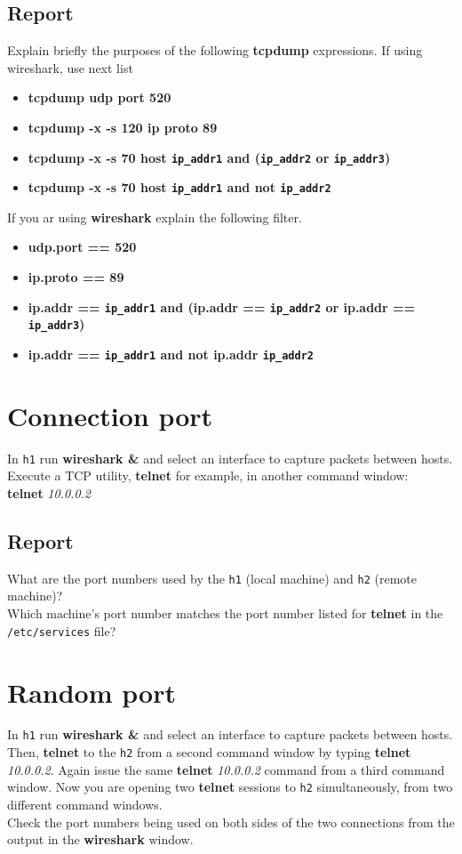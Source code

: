 \documentclass[10pt,a4paper]{article}
\numberwithin{equation}{section}
\numberwithin{figure}{section}
\numberwithin{table}{section}
\begin{document}
\subsection*{Report}
Explain briefly the purposes of the following \textbf{tcpdump} expressions. If using wireshark, use next list
\begin{itemize}
    \item \textbf{tcpdump udp port 520}
    \item \textbf{tcpdump -x -s 120 ip proto 89}
    \item \textbf{tcpdump -x -s 70 host \texttt{ip\_addr1} and (\texttt{ip\_addr2} or \texttt{ip\_addr3})}
    \item \textbf{tcpdump -x -s 70 host \texttt{ip\_addr1} and not \texttt{ip\_addr2}}
\end{itemize}
If you ar using \textbf{wireshark} explain the following filter.
\begin{itemize}
    \item \textbf{udp.port == 520}
    \item \textbf{ip.proto == 89}
    \item \textbf{ip.addr == \texttt{ip\_addr1} and (ip.addr == \texttt{ip\_addr2} or ip.addr == \texttt{ip\_addr3})}
    \item \textbf{ip.addr == \texttt{ip\_addr1} and not ip.addr \texttt{ip\_addr2}}
\end{itemize}

\section{Connection port}
    In \texttt{h1} run \textbf{wireshark \&} and select an interface to capture packets between hosts. \\
    Execute a TCP utility, \textbf{telnet} for example, in another command window: \\
    \textbf{telnet} \textit{10.0.0.2}
    \subsection*{Report}
    What are the port numbers used by the \texttt{h1} (local machine) and \texttt{h2} (remote machine)? \\
    Which machine’s port number matches the port number listed for \textbf{telnet} in the \texttt{/etc/services} file? \\

    \section{Random port}
    In \texttt{h1} run \textbf{wireshark \&} and select an interface to capture packets between hosts. \\
    Then, \textbf{telnet} to the \texttt{h2} from a second command window by typing \textbf{telnet} \textit{10.0.0.2}.
    Again issue the same \textbf{telnet} \textit{10.0.0.2} command from a third command window.
    Now you are opening two \textbf{telnet} sessions to \texttt{h2} simultaneously, from two different command windows. \\
    Check the port numbers being used on both sides of the two connections from the output in the \textbf{wireshark} window. \\
\end{document}
